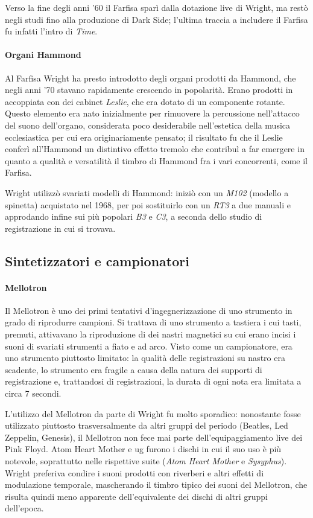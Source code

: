 \documentclass[class=book, crop=false, oneside, 12pt]{standalone}
\begin{document}
    Verso la fine degli anni '60 il Farfisa sparì dalla dotazione live di Wright, ma restò negli studi fino alla produzione di Dark Side; l'ultima traccia a includere il Farfisa fu infatti l'intro di \emph{Time}.

    \paragraph{Organi Hammond}
    Al Farfisa Wright ha presto introdotto degli organi prodotti da Hammond, che negli anni '70 stavano rapidamente crescendo in popolarità. Erano prodotti in accoppiata con dei cabinet \emph{Leslie}, che era dotato di un componente rotante. Questo elemento era nato inizialmente per rimuovere la percussione nell'attacco del suono dell'organo, considerata poco desiderabile nell'estetica della musica ecclesiastica per cui era originariamente pensato; il risultato fu che il Leslie conferì all'Hammond un distintivo effetto tremolo che contribuì a far emergere in quanto a qualità e versatilità il timbro di Hammond fra i vari concorrenti, come il Farfisa.

    Wright utilizzò svariati modelli di Hammond: iniziò con un \emph{M102} (modello a spinetta) acquistato nel 1968, per poi sostituirlo con un \emph{RT3} a due manuali e approdando infine sui più popolari \emph{B3} e \emph{C3}, a seconda dello studio di registrazione in cui si trovava.
    
    \subsection{Sintetizzatori e campionatori}
    \paragraph{Mellotron}
    Il Mellotron è uno dei primi tentativi d'ingegnerizzazione di uno strumento in grado di riprodurre campioni. Si trattava di uno strumento a tastiera i cui tasti, premuti, attivavano la riproduzione di dei nastri magnetici su cui erano incisi i suoni di svariati strumenti a fiato e ad arco. Visto come un campionatore, era uno strumento piuttosto limitato: la qualità delle registrazioni su nastro era scadente, lo strumento era fragile a causa della natura dei supporti di registrazione e, trattandosi di registrazioni, la durata di ogni nota era limitata a circa 7 secondi.

    L'utilizzo del Mellotron da parte di Wright fu molto sporadico: nonostante fosse utilizzato piuttosto trasversalmente da altri gruppi del periodo (Beatles, Led Zeppelin, Genesis), il Mellotron non fece mai parte dell'equipaggiamento live dei Pink Floyd. Atom Heart Mother e \acrshort{ug} furono i dischi in cui il suo uso è più notevole, soprattutto nelle rispettive suite (\emph{Atom Heart Mother} e \emph{Sysyphus}). Wright preferiva condire i suoni prodotti con riverberi e altri effetti di modulazione temporale, mascherando il timbro tipico dei suoni del Mellotron, che risulta quindi meno apparente dell'equivalente dei dischi di altri gruppi dell'epoca.
\end{document}
